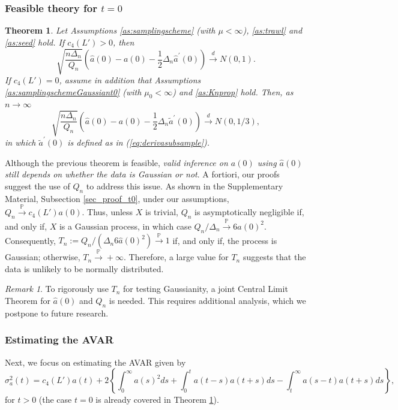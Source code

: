 \documentclass{article}
\theoremstyle{plain}
\newtheorem{theorem}{Theorem}
\theoremstyle{definition}
\theoremstyle{remark}
\newtheorem{remark}{Remark}[section]
\begin{document}
\subsubsection{Feasible theory for $t=0$}
\begin{theorem}\label{thm:CLTfeasible-1} Let Assumptions \ref{as:samplingscheme} (with $\mu<\infty$),
	\ref{as:trawl} and \ref{as:seed} hold. If $c_{4}(L')>0$,
	then 
	\[
	\sqrt{\frac{n\Delta_{n}}{Q_{n}}}\left(\hat{a}(0)-a(0)-\frac{1}{2}\Delta_{n}\hat{a}^{\prime}(0)\right)\overset{d}{\rightarrow}N(0,1).
	\]
	If $c_{4}(L')=0$, assume in addition that Assumptions \ref{as:samplingschemeGaussiant0} (with $\mu_{0}<\infty$)
	and \ref{as:Knprop} hold. Then, as $n\rightarrow\infty$ 
	\[
	\sqrt{\frac{n\Delta_{n}}{Q_{n}}}\left(\hat{a}(0)-a(0)-\frac{1}{2}\Delta_{n}\tilde{a}^{\prime}(0)\right)\overset{d}{\rightarrow}N(0,1/3),
	\]
	in which $\tilde{a}^{\prime}(0)$ is defined as in (\ref{eq:derivasubsample}).
	
\end{theorem}	
Although the previous theorem is feasible, \textit{valid inference on $a(0)$ using $\hat{a}(0)$ still depends on whether the data is Gaussian or not}. A fortiori, our proofs suggest the use of $Q_n$ to address this issue. As shown in  the Supplementary Material, Subsection \ref{sec_proof_t0}, under our assumptions, $Q_{n}\overset{\mathbb{P}}{\rightarrow}c_{4}(L')a(0)$. Thus, unless $X$ is trivial, $Q_n$ is asymptotically negligible if, and only if, $X$ is a Gaussian process, in which case $Q_{n}/\Delta_{n}\overset{\mathbb{P}}{\rightarrow}6a(0)^{2}$. Consequently, $T_{n}:=Q_{n}/(\Delta_{n}6\hat{a}(0)^{2})\overset{\mathbb{P}}{\rightarrow}1$ if, and only if, the process is Gaussian; otherwise, $T_{n}\overset{\mathbb{P}}{\rightarrow}+\infty$. Therefore, a large value for $T_n$ suggests that the data is unlikely to be normally distributed.
\begin{remark}
  To rigorously use $T_n$ for testing Gaussianity, a joint Central Limit Theorem for $\hat{a}(0)$ and $Q_n$ is needed. This requires additional analysis, which we postpone to future research.
\end{remark} 


\subsubsection{Estimating the AVAR}
Next, we focus on estimating  the AVAR given by  
\[
\sigma_{a}^{2}(t)=c_{4}(L')a(t)+2\left\{ \int_{0}^{\infty}a(s)^{2}ds+\int_{0}^{t}a(t-s)a(t+s)ds-\int_{t}^{\infty}a(s-t)a(t+s)ds\right\},
\]
for $t>0$ (the case $t=0$ is already covered in Theorem \ref{thm:CLTfeasible-1}). 
\end{document}
